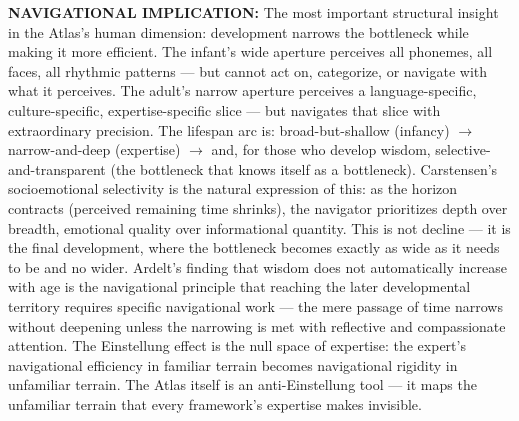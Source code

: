 \textbf{NAVIGATIONAL IMPLICATION:} The most important structural insight in the Atlas's human dimension: development narrows the bottleneck while making it more efficient. The infant's wide aperture perceives all phonemes, all faces, all rhythmic patterns — but cannot act on, categorize, or navigate with what it perceives. The adult's narrow aperture perceives a language-specific, culture-specific, expertise-specific slice — but navigates that slice with extraordinary precision. The lifespan arc is: broad-but-shallow (infancy) $\rightarrow$ narrow-and-deep (expertise) $\rightarrow$ and, for those who develop wisdom, selective-and-transparent (the bottleneck that knows itself as a bottleneck). Carstensen's socioemotional selectivity is the natural expression of this: as the horizon contracts (perceived remaining time shrinks), the navigator prioritizes depth over breadth, emotional quality over informational quantity. This is not decline — it is the final development, where the bottleneck becomes exactly as wide as it needs to be and no wider. Ardelt's finding that wisdom does not automatically increase with age is the navigational principle that reaching the later developmental territory requires specific navigational work — the mere passage of time narrows without deepening unless the narrowing is met with reflective and compassionate attention. The Einstellung effect is the null space of expertise: the expert's navigational efficiency in familiar terrain becomes navigational rigidity in unfamiliar terrain. The Atlas itself is an anti-Einstellung tool — it maps the unfamiliar terrain that every framework's expertise makes invisible.


\bigskip\noindent\makebox[\textwidth]{\color{rulegray}\rule{5cm}{0.3pt}}\bigskip
